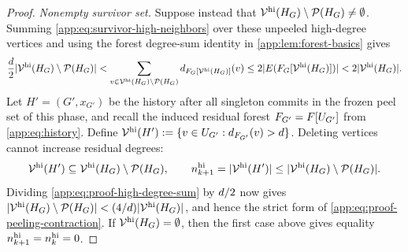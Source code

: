 \begin{proof}
\emph{Nonempty survivor set.}
Suppose instead that $\mathcal V^{\mathrm{hi}}(H_{G})\setminus\mathcal P(H_{G})\ne\emptyset$.
Summing \eqref{app:eq:survivor-high-neighbors} over these unpeeled high-degree
vertices and using the forest degree-sum identity in
\cref{app:lem:forest-basics} gives
\begin{equation}
 \frac{d}{2}
 |\mathcal V^{\mathrm{hi}}(H_{G})\setminus\mathcal P(H_{G})|
 <\sum_{v\in\mathcal V^{\mathrm{hi}}(H_{G})\setminus\mathcal P(H_{G})}
   d_{F_{G}[\mathcal V^{\mathrm{hi}}(H_{G})]}(v)
 \le2|E(F_{G}[\mathcal V^{\mathrm{hi}}(H_{G})])|
 <2|\mathcal V^{\mathrm{hi}}(H_{G})|.
 \label{app:eq:proof-high-degree-sum}
\end{equation}
Let $H'=(G',x_{G'})$ be the history after all singleton commits in the frozen
peel set of this phase, and recall the induced residual forest
$F_{G'}=F[U_{G'}]$ from
\eqref{app:eq:history}.  Define
$\mathcal V^{\mathrm{hi}}(H'):=\{v\in U_{G'}:
 d_{F_{G'}}(v)>d\}$.
Deleting vertices cannot increase residual degrees:
\[
 \mathcal V^{\mathrm{hi}}(H')\subseteq\mathcal V^{\mathrm{hi}}(H_{G})\setminus\mathcal P(H_{G}),
 \qquad
 n_{k+1}^{\mathrm{hi}}=|\mathcal V^{\mathrm{hi}}(H')|
 \le|\mathcal V^{\mathrm{hi}}(H_{G})\setminus\mathcal P(H_{G})|.
\]
Dividing \eqref{app:eq:proof-high-degree-sum} by $d/2$ now gives
$|\mathcal V^{\mathrm{hi}}(H_{G})\setminus\mathcal P(H_{G})|<(4/d)|\mathcal V^{\mathrm{hi}}(H_{G})|$,
and hence the strict form of \eqref{app:eq:proof-peeling-contraction}.  If
$\mathcal V^{\mathrm{hi}}(H_{G})=\emptyset$, then the first case above gives equality
$n_{k+1}^{\mathrm{hi}}=n_{k}^{\mathrm{hi}}=0$.


\end{proof}
